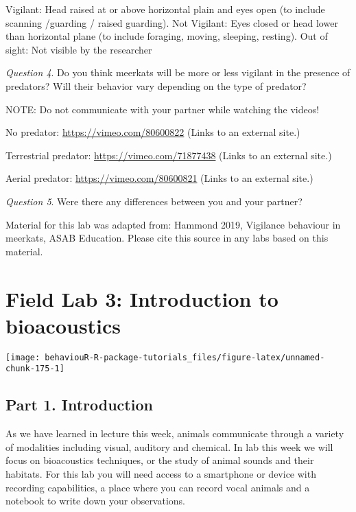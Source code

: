 \documentclass[]{book}
\begin{document}
Vigilant: Head raised at or above horizontal plain and eyes open (to include scanning /guarding / raised guarding).
Not Vigilant: Eyes closed or head lower than horizontal plane (to include foraging, moving, sleeping, resting).
Out of sight: Not visible by the researcher

\emph{Question 4}. Do you think meerkats will be more or less vigilant in the presence of predators? Will their behavior vary depending on the type of predator?

NOTE: Do not communicate with your partner while watching the videos!

No predator: \url{https://vimeo.com/80600822} (Links to an external site.)

Terrestrial predator: \url{https://vimeo.com/71877438} (Links to an external site.)

Aerial predator: \url{https://vimeo.com/80600821} (Links to an external site.)

\emph{Question 5}. Were there any differences between you and your partner?

Material for this lab was adapted from: Hammond 2019, Vigilance behaviour in meerkats, ASAB Education. Please cite this source in any labs based on this material.

\hypertarget{field-lab-3-introduction-to-bioacoustics}{%
\chapter*{Field Lab 3: Introduction to bioacoustics}\label{field-lab-3-introduction-to-bioacoustics}}

\begin{center}\texttt{[image: behaviouR-R-package-tutorials\_files/figure-latex/unnamed-chunk-175-1]} \end{center}

\hypertarget{part-1.-introduction}{%
\section*{Part 1. Introduction}\label{part-1.-introduction}}

As we have learned in lecture this week, animals communicate through a variety of modalities including visual, auditory and chemical. In lab this week we will focus on bioacoustics techniques, or the study of animal sounds and their habitats. For this lab you will need access to a smartphone or device with recording capabilities, a place where you can record vocal animals and a notebook to write down your observations.
\end{document}
